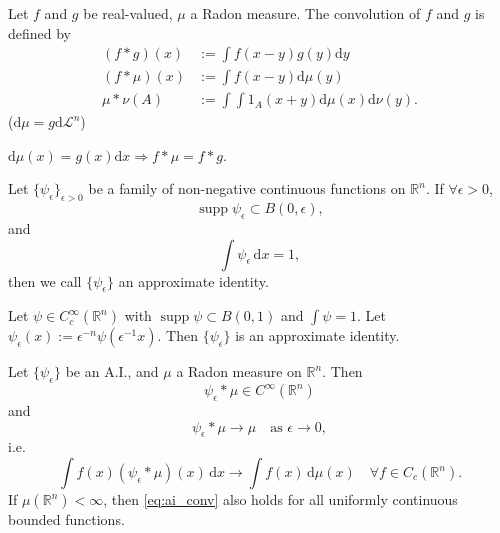     \begin{definition}
    Let $f$ and $g$ be real-valued, $\mu$ a Radon measure. The convolution of $f$ and $g$ is defined by
    \begin{align}
        (f*g)(x) & :=\int f(x-y)g(y)\mathrm{d}y \\
        (f*\mu)(x) & := \int f(x-y)\mathrm{d}\mu(y) \\
        \mu * \nu(A) & := \int \int 1_{A}(x+y)\mathrm{d}\mu(x)\mathrm{d}\nu(y).
    \end{align}
    ($\mathrm{d}\mu=g \mathrm{d}\mathcal{L}^{n}$) 
    \end{definition}

    \begin{remark}
    $\mathrm{d}\mu(x)=g(x)\mathrm{d}x\Rightarrow f*\mu=f*g$.
    \end{remark}

    \begin{definition}
    Let $\{ \psi_{\epsilon} \}_{\epsilon>0}$ be a family of non-negative continuous functions on $\mathbb{R}^{n}$. If $\forall \epsilon>0$,
        \begin{equation*}
            \operatorname{supp}\psi_{\epsilon} \subset B(0,\epsilon),
        \end{equation*}
    and
        \begin{equation*}
            \int \psi_{\epsilon} \,\mathrm{d}x = 1,
        \end{equation*}
    then we call $\{ \psi_{\epsilon} \}$ an approximate identity.
    \end{definition}

    \begin{example}
    Let $\psi \in C_{c}^{\infty}(\mathbb{R}^{n})$ with $\operatorname{supp}\psi \subset B(0,1)$ and $\int \psi=1$. Let $\psi _{\epsilon}(x):=\epsilon ^{-n}\psi(\epsilon ^{-1}x)$. Then $\{ \psi _{\epsilon} \}$ is an approximate identity.
    \end{example}

    \begin{theorem}
    \label{thm:ai}
    Let $\{ \psi _{\epsilon} \}$ be an A.I., and $\mu$ a Radon measure on $\mathbb{R}^{n}$. Then
        \begin{equation}
        \psi _{\epsilon}*\mu \in C^{\infty}(\mathbb{R}^{n})
        \label{eq:ai_smooth}
        \end{equation}
    and
        \begin{equation*}
        \psi _{\epsilon}*\mu\to \mu \quad\text{as }\epsilon\to 0,
        \end{equation*}
    i.e.
        \begin{equation}
        \int f(x)(\psi _{\epsilon}*\mu)(x)\,\mathrm{d}x\to \int f(x)\,\mathrm{d}\mu(x)\quad \forall f \in C_{c}(\mathbb{R}^{n}).
        \label{eq:ai_conv}
        \end{equation}
    If $\mu(\mathbb{R}^{n})<\infty$, then \eqref{eq:ai_conv} also holds for all uniformly continuous bounded functions.
    \end{theorem}

